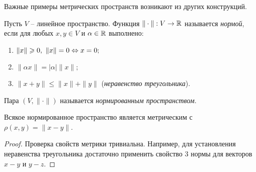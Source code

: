 Важные примеры метрических пространств возникают из других конструкций.

\begin{definition}
    Пусть $V$ -- линейное пространство. Функция $\|\cdot\|: V \to \mathbb{R}$ называется \textit{нормой}, если для любых $x, y \in V$ и $\alpha \in \mathbb{R}$ выполнено:

    \begin{enumerate}
        \item $\|x\| \geqslant 0, \ \|x\| = 0 \Leftrightarrow x = 0;$
        \item $\|\alpha x\| = |\alpha|\|x\|;$
        \item $\|x + y\| \leq \|x\| + \|y\|$ (\textit{неравенство треугольника}).
    \end{enumerate}

    Пара $(V, \|\cdot\|)$ называется \textit{нормированным пространством}.
\end{definition}

\begin{lemma}
    Всякое нормированное пространство является метрическим с $\rho(x, y) = \|x - y\|$.
\end{lemma}

\begin{proof}
    Проверка свойств метрики тривиальна. Например, для установления неравенства треугольника достаточно применить свойство 3 нормы для векторов $x - y$ и $y - z$.
\end{proof}